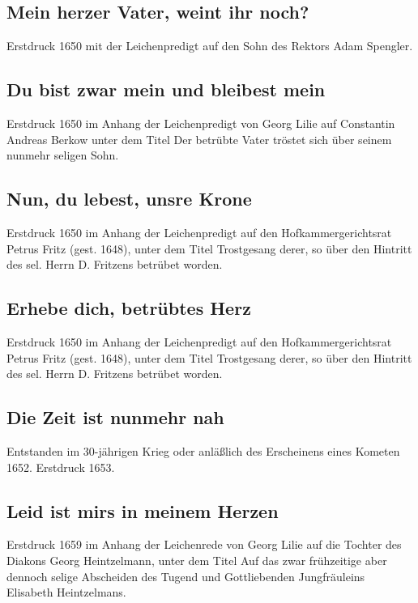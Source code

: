 \subsection*{ Mein herzer Vater, weint ihr noch?}

Erstdruck 1650 mit der Leichenpredigt auf den Sohn des Rektors Adam
Spengler.

\subsection*{ Du bist zwar mein und bleibest mein}

Erstdruck 1650 im Anhang der Leichenpredigt von Georg Lilie auf
Constantin Andreas Berkow unter dem Titel \frqq Der betrübte Vater tröstet
sich über seinem nunmehr seligen Sohn\flqq .

\subsection*{ Nun, du lebest, unsre Krone}

Erstdruck 1650 im Anhang der Leichenpredigt auf den Hofkammergerichtsrat
Petrus Fritz (gest. 1648), unter dem Titel \frqq Trostgesang derer, so über
den Hintritt des sel. Herrn D. Fritzens betrübet worden\flqq .

\subsection*{ Erhebe dich, betrübtes Herz}

Erstdruck 1650 im Anhang der Leichenpredigt auf den Hofkammergerichtsrat
Petrus Fritz (gest. 1648), unter dem Titel \frqq Trostgesang derer, so über
den Hintritt des sel. Herrn D. Fritzens betrübet worden\flqq .

\subsection*{ Die Zeit ist nunmehr nah}

Entstanden im 30-jährigen Krieg oder anläßlich des Erscheinens eines
Kometen 1652. Erstdruck 1653.

\subsection*{ Leid ist mirs in meinem Herzen}

Erstdruck 1659 im Anhang der Leichenrede von Georg Lilie auf die Tochter
des Diakons Georg Heintzelmann, unter dem Titel \frqq Auf das zwar
frühzeitige aber dennoch selige Abscheiden des Tugend und Gottliebenden
Jungfräuleins Elisabeth Heintzelmans\flqq .

